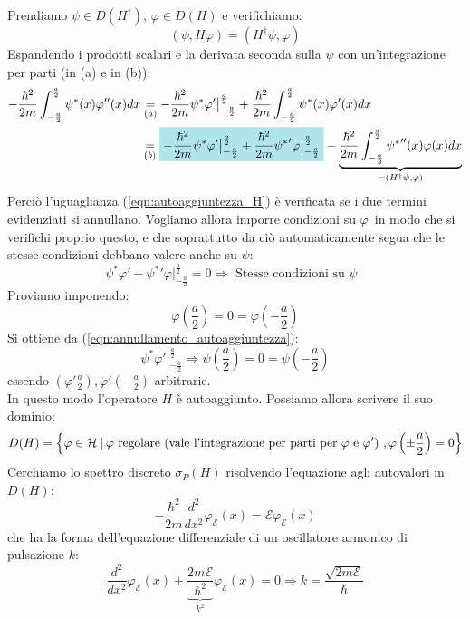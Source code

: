 \documentclass[../../FisicaTeorica.tex]{subfiles}
\begin{document}
Prendiamo $\psi \in D(H^\dag)$, $\varphi \in D(H)$ e verifichiamo:
\begin{equation}
(\psi, H\varphi) = (H^\dag \psi,\varphi)
\label{eqn:autoaggiuntezza_H}
\end{equation}
Espandendo i prodotti scalari e  la derivata seconda sulla $\psi$ con un'integrazione per parti (in (a) e in (b)):
\begin{align*}
-\frac{\hbar^2}{2m}\int_{-\frac{a}{2}}^{\frac{a}{2}} \psi^*(x) \varphi''(x)dx &\underset{(a)}{=} -\frac{\hbar^2}{2m}\psi^*\varphi' \big|_{-\frac{a}{2}}^{\frac{a}{2}} + \frac{\hbar^2}{2m}\int_{-\frac{a}{2}}^{\frac{a}{2}}{\psi^*}(x)\varphi'(x)dx\\
&\underset{(b)}{=} \hlc{SkyBlue}{-\frac{\hbar^2}{2m}\psi^*\varphi'\big|_{-\frac{a}{2}}^{\frac{a}{2}}+\frac{\hbar^2}{2m}{\psi^*}'\varphi\big|_{-\frac{a}{2}}^{\frac{a}{2}}} - \underbrace{\frac{\hbar^2}{2m}\int_{-\frac{a}{2}}^{\frac{a}{2}}{\psi^*}''(x)\varphi(x)dx}_{=(H^\dag \psi,\varphi)}
\end{align*}
Perciò l'uguaglianza (\ref{eqn:autoaggiuntezza_H}) è verificata se i due termini evidenziati si annullano. Vogliamo allora imporre condizioni su $\varphi$\ in modo che si verifichi proprio questo, e che soprattutto da ciò automaticamente segua che le stesse condizioni debbano valere anche su $\psi$:
\begin{equation}
\psi^*\varphi'-{\psi^*}'\varphi\big|_{-\frac{a}{2}}^{\frac{a}{2}}=0\Rightarrow \text{ Stesse condizioni su $\psi$ }
\label{eqn:annullamento_autoaggiuntezza}
\end{equation}
Proviamo imponendo:
\[
\varphi\left(\frac{a}{2}\right)=0=\varphi\left(-\frac{a}{2}\right)
\]
Si ottiene da (\ref{eqn:annullamento_autoaggiuntezza}):
\[
\psi^*\varphi'\big|_{-\frac{a}{2}}^{\frac{a}{2}} \Rightarrow \psi\left(\frac{a}{2}\right)=0=\psi\left(-\frac{a}{2}\right)
\]
essendo $(\varphi'\frac{a}{2}), \varphi'(-\frac{a}{2})$ arbitrarie.\\
In questo modo l'operatore $H$ è autoaggiunto. Possiamo allora scrivere il suo dominio:
\[
D(H)= \left \{\varphi \in \mathcal{H}\>|\> \varphi \text{ regolare (vale l'integrazione per parti per $\varphi$ e $\varphi'$) }, \varphi\left(\pm \frac{a}{2}\right) =  0\right \}
\]
Cerchiamo lo spettro discreto $\sigma_P(H)$ risolvendo l'equazione agli autovalori in $D(H)$:
\[
-\frac{\hbar^2}{2m}\frac{d^2}{dx^2}\varphi_{\mathcal{E}}(x) = \mathcal{E}\varphi_{\mathcal{E}}(x)
\]
che ha la forma dell'equazione differenziale di un oscillatore armonico di pulsazione $k$:
\begin{equation}
\frac{d^2}{dx^2}\varphi_\mathcal{E}(x)+\underbrace{\frac{2m\mathcal{E}}{\hbar^2}}_{k^2}\varphi_\mathcal{E}(x)=0 \Rightarrow k = \frac{\sqrt{2m\mathcal{E}}}{\hbar}
\label{eqn:oscillatore_armonico}
\end{equation}
\end{document}
